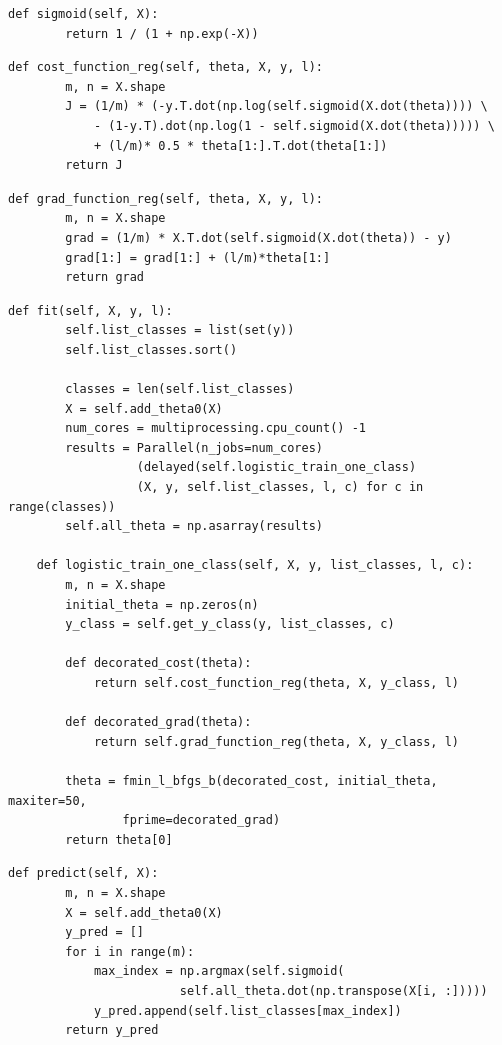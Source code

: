 \documentclass[letterpaper,10pt]{article}
\theoremstyle{mytheor}
\begin{document}
\begin{lstlisting}[label={list:second},caption=Sigmoid Function]
	def sigmoid(self, X):
		return 1 / (1 + np.exp(-X))
\end{lstlisting}

\begin{lstlisting}[label={list:third},caption=Cost Function]
	def cost_function_reg(self, theta, X, y, l):
        m, n = X.shape
        J = (1/m) * (-y.T.dot(np.log(self.sigmoid(X.dot(theta)))) \ 
        	- (1-y.T).dot(np.log(1 - self.sigmoid(X.dot(theta))))) \
            + (l/m)* 0.5 * theta[1:].T.dot(theta[1:])
        return J
\end{lstlisting}

\begin{lstlisting}[label={list:fourth},caption=Gradient Function]
    def grad_function_reg(self, theta, X, y, l):
        m, n = X.shape
        grad = (1/m) * X.T.dot(self.sigmoid(X.dot(theta)) - y)
        grad[1:] = grad[1:] + (l/m)*theta[1:]
        return grad
\end{lstlisting}

\begin{lstlisting}[label={list:fifth},caption=Training Process]
    def fit(self, X, y, l):
        self.list_classes = list(set(y))
        self.list_classes.sort()

        classes = len(self.list_classes)
        X = self.add_theta0(X)
        num_cores = multiprocessing.cpu_count() -1
        results = Parallel(n_jobs=num_cores) 
        		  (delayed(self.logistic_train_one_class)
        		  (X, y, self.list_classes, l, c) for c in range(classes))
        self.all_theta = np.asarray(results)

    def logistic_train_one_class(self, X, y, list_classes, l, c):
        m, n = X.shape
        initial_theta = np.zeros(n)
        y_class = self.get_y_class(y, list_classes, c)

        def decorated_cost(theta):
            return self.cost_function_reg(theta, X, y_class, l)

        def decorated_grad(theta):
            return self.grad_function_reg(theta, X, y_class, l)

        theta = fmin_l_bfgs_b(decorated_cost, initial_theta, maxiter=50, 
                fprime=decorated_grad)
        return theta[0]
\end{lstlisting}

\begin{lstlisting}[label={list:fifth},caption=Prediction Process]
    def predict(self, X):
        m, n = X.shape
        X = self.add_theta0(X)
        y_pred = []
        for i in range(m):
            max_index = np.argmax(self.sigmoid(
            			self.all_theta.dot(np.transpose(X[i, :]))))
            y_pred.append(self.list_classes[max_index])
        return y_pred
\end{lstlisting}
\end{document}
